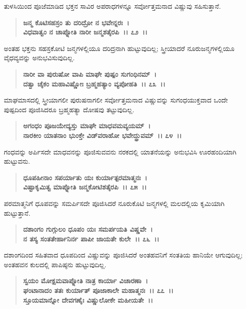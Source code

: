 ತುಳಸಿಯಿಂದ ಪೂಜೆಮಾಡಿದ ಭಕ್ತನ ಸಾವಿರ ಅಪರಾಧಗಳನ್ನೂ ಸರ್ವೋತ್ತಮನಾದ ವಿಷ್ಣುವು ಸಹಿಸುತ್ತಾನೆ.

\begin{verse}
\textbf{ಜನ್ಮ ಕೊಟಿಸಹಸ್ರಂ ತು ದರಿದ್ರೋ ನ ಭವೇನ್ನರಃ~।}\\\textbf{ವಿಧವಾತ್ವಂ ನ ಚಾಪ್ನೋತಿ ನಾರೀ ಜನ್ಮಶತೈರಪಿ~।। ೭೨~।।}
\end{verse}

ಅಂತಹ ಭಕ್ತನು ಸಹಸ್ರಕೋಟಿ ಜನ್ಮಗಳಲ್ಲಿಯೂ ದರಿದ್ರನಾಗಿ ಹುಟ್ಟುವುದಿಲ್ಲ; ಸ್ತ್ರೀಯಾದರೆ ನೂರುಜನ್ಮಗಳಲ್ಲಿಯೂ ವೈಧವ್ಯವನ್ನು ಅನುಭವಿಸುವುದಿಲ್ಲ.

\begin{verse}
\textbf{ನಾರೀ ವಾ ಪುರುಷೋ ವಾಪಿ ಮಾಘೇ ಪುಷ್ಪಂ ಸುಗಂಧಿನಮ್~।}\\\textbf{ದತ್ವಾ ಚೈಕಂ ಮಹಾವಿಷ್ಣೋಃ ಬ್ರಹ್ಮಹತ್ಯಾಂ ವ್ಯಪೋಹತಿ~।। ೭೩~।।}
\end{verse}

ಮಾಘಮಾಸದಲ್ಲಿ ಸ್ತ್ರೀಯಾಗಲೀ ಪುರುಷನಾಗಲೀ ಸರ್ವೋತ್ತಮನಾದ ವಿಷ್ಣುವನ್ನು ಸುಗಂಧಯುಕ್ತವಾದ ಒಂದೇ ಪುಷ್ಪದಿಂದ ಪೂಜಿಸಿದರೂ ಬ್ರಹ್ಮಹತ್ಯಾ ದೋಷವು ತಟ್ಟುವುದಿಲ್ಲ.

\begin{verse}
\textbf{ಅಗಂಧಂ ಪೂಜಯೇದ್ಯಸ್ತು ಮಾಘೇ ಮಾಧವಮವ್ಯಯಮ್~।}\\\textbf{ನಾರಕೀಂ ಯಾತನಾಂ ಭುಂಕ್ತೇ ವಿಡ್‌ವರಾಹೋ ಭವೇದ್ಧ್ರುವಮ್~।। ೭೪~।।}
\end{verse}

ಗಂಧವನ್ನು ಅರ್ಪಿಸದೇ ಮಾಧವನನ್ನು ಪೂಜಿಸುವವನು ನರಕದಲ್ಲಿ ಯಾತನೆಯನ್ನು ಅನುಭವಿಸಿ ಊರಹಂದಿಯಾಗಿ ಹುಟ್ಟುವನು.

\begin{verse}
\textbf{ಧೂಪಹೀನಾಂ ಸಪರ್ಯಾತು ಯಃ ಕುರ್ಯಾತ್ಪರಮಾತ್ಮನಃ~।}\\\textbf{ವಿಷ್ಟಾಕೃಮಿತ್ವ ಮಾಪ್ನೋತಿ ಜನ್ಮಕೋಟಿಶತೈರಪಿ~।। ೭೫~।।}
\end{verse}

ಪರಮಾತ್ಮನಿಗೆ ಧೂಪವನ್ನು ಸಮರ್ಪಿಸದೇ ಪೂಜಿಸಿದರೆ ನೂರುಕೊಟಿ ಜನ್ಮಗಳಲ್ಲಿ ಮಲದಲ್ಲಿಯ ಕೃಮಿಯಾಗಿ ಹುಟ್ಟುತ್ತಾನೆ.

\begin{verse}
\textbf{ದಶಾಂಗಂ ಗುಗ್ಗುಲಂ ಧೂಪಂ ಯಃ ಸಮರ್ಪಯತಿ ವಿಷ್ಣವೇ~।}\\\textbf{ನ ತಸ್ಯ ಸಂತತೇರ್ಹಾನಿರ್ನ ಪಾಪೀ ಜಾಯತೇ ಕುಲೇ~।। ೭೬~।।}
\end{verse}

ದಶಾಂಗದಿಂದ ಸಹಿತವಾದ ಧೂಪದಿಂದ ವಿಷ್ಣುವನ್ನು ಪೂಜಿಸಿದರೆ ಅಂತಹವನಿಗೆ ಸಂತತಿಯ ಹಾನಿಯೇ ಆಗುವುದಿಲ್ಲ; ಅಂತಹವನ ಕುಲದಲ್ಲಿ ಪಾಪಿಷ್ಠನು ಹುಟ್ಟುವುದಿಲ್ಲ.

\begin{verse}
\textbf{ಸ್ವಯಂ ಮೋಕ್ಷಮವಾಪ್ನೋತಿ ನಾತ್ರ ಕಾರ್ಯಾ ವಿಚಾರಣಾ~।}\\\textbf{ಘಂಟಾನಾದಂ ತತಃ ಕುರ್ಯಾತ್ ಪೂಜಾಕಾಲೇ ಮಹಾತ್ಮನಃ~।। ೭೭~।।}\\\textbf{ಸ್ತೂಯಮಾನ್ನೋ ದೇವಗಣೈಃ ವಿಷ್ಣುಲೋಕೇ ಮಹೀಯತೇ~।।}
\end{verse}


